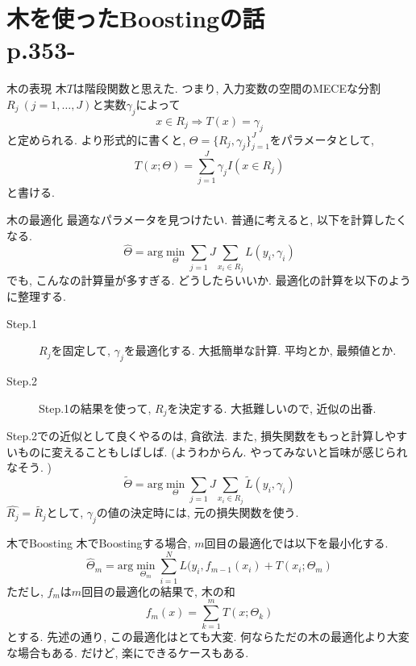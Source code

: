 \documentclass[dvipdfmx,8pt]{beamer}
\begin{document}
  \section{木を使ったBoostingの話\\p.353-}
  \begin{frame}{木の表現}
    木$T$は階段関数と思えた. つまり, 入力変数の空間のMECEな分割$R_{j} \ (j=1,\dots,J)$と実数$\gamma_{j}$によって
    \[
      x\in R_{j} \Rightarrow T(x)=\gamma_{j}
    \]
    と定められる. より形式的に書くと, $\Theta=\{R_{j}, \gamma_{j}\}_{j=1}^{J}$をパラメータとして,
    \[
      T(x;\Theta)=\sum_{j=1}^{J}\gamma_{j}I(x\in R_{j})
    \]
    と書ける.
  \end{frame}
  \begin{frame}{木の最適化}
    最適なパラメータを見つけたい. 普通に考えると, 以下を計算したくなる.
    \[
      \hat{\Theta}=\mathrm{arg}\min_{\Theta}\sum_{j=1}{J}\sum_{x_{i} \in R_{j}}L(y_{i}, \gamma_{i})
    \]
    でも, こんなの計算量が多すぎる. どうしたらいいか. 最適化の計算を以下のように整理する.
    \begin{description}
      \item[Step.1] $R_{j}$を固定して, $\gamma_{j}$を最適化する. 大抵簡単な計算. 平均とか, 最頻値とか.
      \item[Step.2] Step.1の結果を使って, $R_j$を決定する. 大抵難しいので, 近似の出番.
    \end{description}
    Step.2での近似として良くやるのは, 貪欲法. また, 損失関数をもっと計算しやすいものに変えることもしばしば. (ようわからん. やってみないと旨味が感じられなそう. )
    \[
      \tilde{\Theta}=\mathrm{arg}\min_{\Theta}\sum_{j=1}{J}\sum_{x_{i} \in R_{j}}\tilde{L}(y_{i}, \gamma_{i})
    \]
    $\hat{R_{j}}=\tilde{R_{j}}$として, $\gamma_{j}$の値の決定時には, 元の損失関数を使う.
  \end{frame}
  \begin{frame}{木でBoosting}
    木でBoostingする場合, $m$回目の最適化では以下を最小化する.
    \[
      \hat{\Theta}_{m}=\mathrm{arg}\min_{\Theta_{m}}\sum_{i=1}^{N}L(y_i,f_{m-1}(x_i)+T(x_i;\Theta_{m})
    \]
    ただし, $f_{m}$は$m$回目の最適化の結果で, 木の和
    \[
      f_{m}(x)=\sum_{k=1}^{m}T(x;\Theta_{k})
    \]
    とする. 先述の通り, この最適化はとても大変. 何ならただの木の最適化より大変な場合もある. だけど, 楽にできるケースもある.
  \end{frame}
\end{document}
